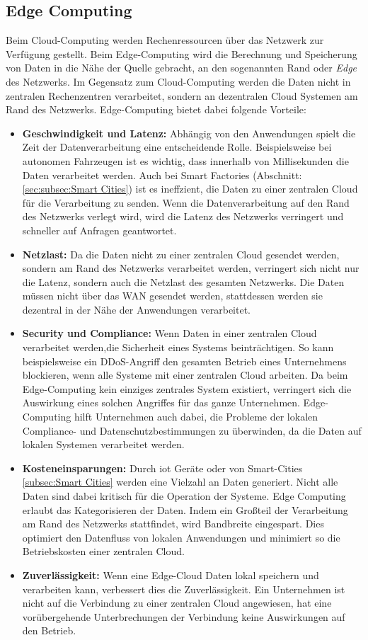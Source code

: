 \documentclass[runningheads]{llncs}
\numberwithin{figure}{section}
\begin{document}
\subsection{Edge Computing}
\label{sub:Edge Computing}
Beim Cloud-Computing werden Rechenressourcen über das Netzwerk zur Verfügung gestellt.
Beim Edge-Computing wird die Berechnung und Speicherung von Daten in die Nähe der Quelle gebracht,
an den sogenannten Rand oder \textit{Edge} des Netzwerks. Im Gegensatz zum Cloud-Computing werden die Daten
nicht in zentralen Rechenzentren verarbeitet, sondern an dezentralen Cloud Systemen am Rand des Netzwerks. 
Edge-Computing bietet dabei folgende Vorteile: \cite{inproceedings} \cite{labrieTopBenefitsEdge} 
\begin{itemize}
  \item \textbf{Geschwindigkeit und Latenz:} Abhängig von den Anwendungen spielt die Zeit der Datenverarbeitung eine
  entscheidende Rolle. Beispielsweise bei autonomen Fahrzeugen ist es wichtig, dass innerhalb von Millisekunden die Daten
  verarbeitet werden. Auch bei Smart Factories (Abschnitt: \ref{sec:subsec:Smart Cities}) ist es ineffzient, 
  die Daten zu einer zentralen Cloud für die Verarbeitung zu senden. 
  Wenn die Datenverarbeitung auf den Rand des Netzwerks verlegt wird, wird die Latenz des Netzwerks verringert und schneller
  auf Anfragen geantwortet. 
  \item \textbf{Netzlast:} Da die Daten nicht zu einer zentralen Cloud gesendet werden, sondern am Rand des Netzwerks 
  verarbeitet werden, verringert sich nicht nur die Latenz, sondern auch die Netzlast des gesamten Netzwerks. 
  Die Daten müssen nicht über das WAN gesendet werden, stattdessen werden sie 
  dezentral in der Nähe der Anwendungen verarbeitet.
  \item \textbf{Security und Compliance:} Wenn Daten in einer zentralen Cloud verarbeitet werden,die Sicherheit eines Systems beinträchtigen.
  So kann beispielsweise ein DDoS-Angriff den gesamten Betrieb eines Unternehmens blockieren, wenn alle Systeme mit einer zentralen
  Cloud arbeiten. Da beim Edge-Computing kein einziges zentrales System existiert, verringert sich die Auswirkung eines solchen
  Angriffes für das ganze Unternehmen.  
  Edge-Computing hilft Unternehmen auch dabei, die Probleme der lokalen Compliance- und Datenschutzbestimmungen zu überwinden,
  da die Daten auf lokalen Systemen verarbeitet werden.
  \item \textbf{Kosteneinsparungen:} Durch \acrfull{iot} Geräte oder von Smart-Cities \ref{subsec:Smart Cities} werden
  eine Vielzahl an Daten generiert. Nicht alle Daten sind dabei kritisch für die Operation der Systeme. Edge Computing erlaubt
  das Kategorisieren der Daten. Indem ein Großteil der Verarbeitung am Rand des Netzwerks stattfindet, wird Bandbreite eingespart.
  Dies optimiert den Datenfluss von lokalen Anwendungen und minimiert so die Betriebskosten einer zentralen Cloud.
  \item \textbf{Zuverlässigkeit:} Wenn eine Edge-Cloud Daten lokal speichern und verarbeiten kann, verbessert dies die Zuverlässigkeit.
  Ein Unternehmen ist nicht auf die Verbindung zu einer zentralen Cloud angewiesen, hat eine vorübergehende Unterbrechungen der 
  Verbindung keine Auswirkungen auf den Betrieb.
\end{itemize}
\end{document}
